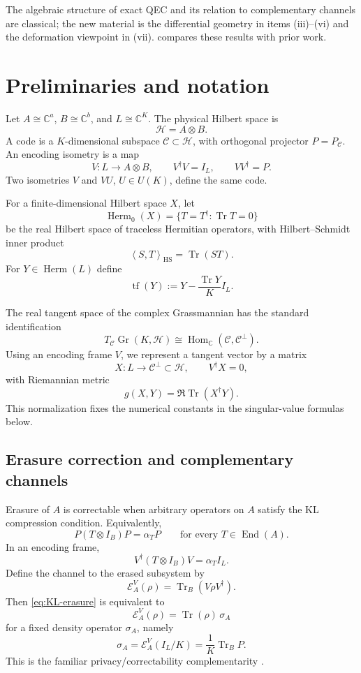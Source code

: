 \documentclass[11pt]{article}
\theoremstyle{definition}
\newcommand{\cH}{\mathcal H}
\newcommand{\cC}{\mathcal C}
\newcommand{\cE}{\mathcal E}
\newcommand{\Gr}{\operatorname{Gr}}
\newcommand{\Herm}{\operatorname{Herm}}
\newcommand{\Tr}{\operatorname{Tr}}
\newcommand{\tf}{\operatorname{tf}}
\newcommand{\C}{\mathbb C}
\newcommand{\1}{\mathbf 1}
\newcommand{\inner}[2]{\left\langle #1,#2\right\rangle}
\begin{document}
The algebraic structure of exact QEC and its relation to complementary channels are classical; the new material is the differential geometry in items (iii)--(vi) and the deformation viewpoint in (vii).   compares these results with prior work.

\section{Preliminaries and notation}

Let $A\cong\C^a$, $B\cong\C^b$, and $L\cong\C^K$.  The physical Hilbert space is
\[
\cH=A\otimes B.
\]
A code is a $K$-dimensional subspace $\cC\subset\cH$, with orthogonal projector $P=P_{\cC}$.  An encoding isometry is a map
\[
V:L\longrightarrow A\otimes B,
\qquad V^\dagger V=I_L,
\qquad VV^\dagger=P.
\]
Two isometries $V$ and $VU$, $U\in U(K)$, define the same code.

For a finite-dimensional Hilbert space $X$, let
\[
\Herm_0(X)=\{T=T^\dagger:\Tr T=0\}
\]
be the real Hilbert space of traceless Hermitian operators, with Hilbert--Schmidt inner product
\[
\inner{S}{T}_{\mathrm{HS}}=\Tr(ST).
\]
For $Y\in\Herm(L)$ define
\[
\tf(Y):=Y-\frac{\Tr Y}{K}I_L.
\]

The real tangent space of the complex Grassmannian has the standard identification
\[
T_{\cC}\Gr(K,\cH)\cong\operatorname{Hom}_{\C}(\cC,\cC^\perp).
\]
Using an encoding frame $V$, we represent a tangent vector by a matrix
\[
X:L\to \cC^\perp\subset\cH,
\qquad V^\dagger X=0,
\]
with Riemannian metric
\[
g(X,Y)=\Re\Tr(X^\dagger Y).
\]
This normalization fixes the numerical constants in the singular-value formulas below.

\subsection{Erasure correction and complementary channels}

Erasure of $A$ is correctable when arbitrary operators on $A$ satisfy the KL compression condition.  Equivalently,
\begin{equation}
P(T\otimes I_B)P=\alpha_T P
\qquad\text{for every }T\in\operatorname{End}(A).
\label{eq:KL-erasure}
\end{equation}
In an encoding frame,
\[
V^\dagger(T\otimes I_B)V=\alpha_T I_L.
\]
Define the channel to the erased subsystem by
\[
\cE_A^V(\rho)=\Tr_B(V\rho V^\dagger).
\]
Then \eqref{eq:KL-erasure} is equivalent to
\begin{equation}
\cE_A^V(\rho)=\Tr(\rho)\,\sigma_A
\label{eq:constant-complement}
\end{equation}
for a fixed density operator $\sigma_A$, namely
\begin{equation}
\sigma_A=\cE_A^V(I_L/K)=\frac1K\Tr_B P.
\label{eq:sigma-def}
\end{equation}
This is the familiar privacy/correctability complementarity \cite{KretschmannKribsSpekkens2007}.
\end{document}
